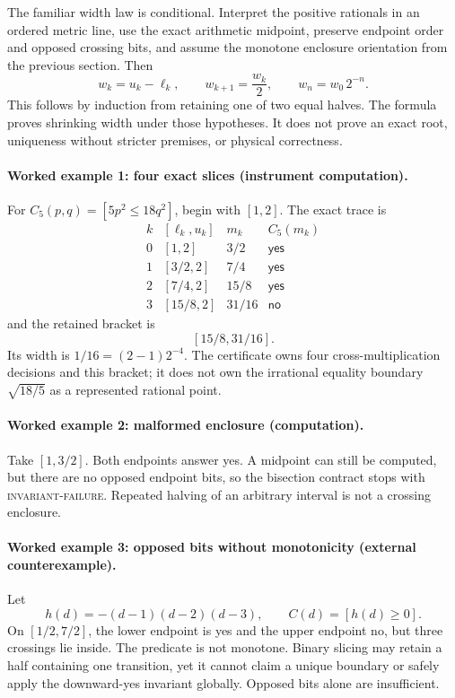 The familiar width law is conditional.  Interpret the positive rationals in an ordered metric line, use the exact
arithmetic midpoint, preserve endpoint order and opposed crossing bits, and assume the monotone enclosure orientation
from the previous section.  Then
\[
       w_k=u_k-\ell_k,\qquad
       w_{k+1}=\frac{w_k}{2},\qquad
       w_n=w_0\,2^{-n}.
\]
This follows by induction from retaining one of two equal halves.  The formula proves shrinking width under those
hypotheses.  It does not prove an exact root, uniqueness without stricter premises, or physical correctness.

\paragraph{Worked example 1: four exact slices (instrument computation).}
For \(C_5(p,q)=[5p^2\le18q^2]\), begin with \([1,2]\).  The exact trace is
\[
\begin{array}{c|c|c|c}
k&[\ell_k,u_k]&m_k&C_5(m_k)\\
\hline
0&[1,2]&3/2&\mathsf{yes}\\
1&[3/2,2]&7/4&\mathsf{yes}\\
2&[7/4,2]&15/8&\mathsf{yes}\\
3&[15/8,2]&31/16&\mathsf{no}
\end{array}
\]
and the retained bracket is
\[
                         [15/8,31/16].
\]
Its width is \(1/16=(2-1)2^{-4}\).  The certificate owns four cross-multiplication decisions and this bracket; it does
not own the irrational equality boundary \(\sqrt{18/5}\) as a represented rational point.

\paragraph{Worked example 2: malformed enclosure (computation).}
Take \([1,3/2]\).  Both endpoints answer yes.  A midpoint can still be computed, but there are no opposed endpoint bits,
so the bisection contract stops with \textsc{invariant-failure}.  Repeated halving of an arbitrary interval is not a
crossing enclosure.

\paragraph{Worked example 3: opposed bits without monotonicity (external counterexample).}
Let
\[
                     h(d)=-(d-1)(d-2)(d-3),\qquad C(d)=[h(d)\ge0].
\]
On \([1/2,7/2]\), the lower endpoint is yes and the upper endpoint no, but three crossings lie inside.  The predicate is not
monotone.  Binary slicing may retain a half containing one transition, yet it cannot claim a unique boundary or safely
apply the downward-yes invariant globally.  Opposed bits alone are insufficient.

